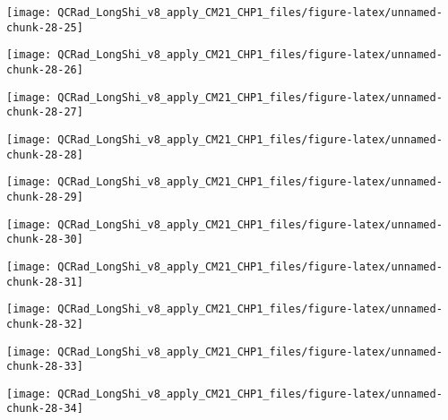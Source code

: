\documentclass[
  10pt,
  a4paper,oneside]{article}
\begin{document}
\begin{center}\texttt{[image: QCRad\_LongShi\_v8\_apply\_CM21\_CHP1\_files/figure-latex/unnamed-chunk-28-25]} \end{center}

\begin{center}\texttt{[image: QCRad\_LongShi\_v8\_apply\_CM21\_CHP1\_files/figure-latex/unnamed-chunk-28-26]} \end{center}

\begin{center}\texttt{[image: QCRad\_LongShi\_v8\_apply\_CM21\_CHP1\_files/figure-latex/unnamed-chunk-28-27]} \end{center}

\begin{center}\texttt{[image: QCRad\_LongShi\_v8\_apply\_CM21\_CHP1\_files/figure-latex/unnamed-chunk-28-28]} \end{center}

\begin{center}\texttt{[image: QCRad\_LongShi\_v8\_apply\_CM21\_CHP1\_files/figure-latex/unnamed-chunk-28-29]} \end{center}

\begin{center}\texttt{[image: QCRad\_LongShi\_v8\_apply\_CM21\_CHP1\_files/figure-latex/unnamed-chunk-28-30]} \end{center}

\begin{center}\texttt{[image: QCRad\_LongShi\_v8\_apply\_CM21\_CHP1\_files/figure-latex/unnamed-chunk-28-31]} \end{center}

\begin{center}\texttt{[image: QCRad\_LongShi\_v8\_apply\_CM21\_CHP1\_files/figure-latex/unnamed-chunk-28-32]} \end{center}

\begin{center}\texttt{[image: QCRad\_LongShi\_v8\_apply\_CM21\_CHP1\_files/figure-latex/unnamed-chunk-28-33]} \end{center}

\begin{center}\texttt{[image: QCRad\_LongShi\_v8\_apply\_CM21\_CHP1\_files/figure-latex/unnamed-chunk-28-34]} \end{center}
\end{document}
